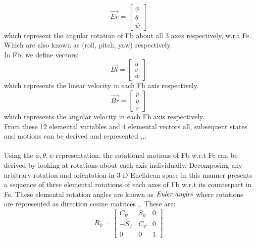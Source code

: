 \documentclass[12pt,a4paper,twoside]{report}
\begin{document}
			\\
			\begin{equation}
				\vec{Er} = 
				\begin{bmatrix}
					\phi \\
					\theta \\
					\psi
				\end{bmatrix}
			\end{equation}
			which represent the angular rotation of Fb about all 3 axes respectively, w.r.t Fe. Which are also known as (roll, pitch, yaw) respectively.
			\\
			In Fb, we define vectors:
			\\
			\begin{equation}
				\vec{Bl} = 
				\begin{bmatrix}
					u \\
					v \\
					w
				\end{bmatrix}
			\end{equation}
			which represents the linear velocity in each Fb axis respectively.
			\\
			\begin{equation}
				\vec{Br} = 
				\begin{bmatrix}
					p \\
					q \\
					r
				\end{bmatrix}
			\end{equation}
			which represents the angular velocity in each Fb axis respectively.
			\\
			From these 12 elemental variables and 4 elemental vectors all, subsequent states and motions can be derived and represented \cite{1},\cite{2},\cite{4}.
			\\ \\
			Using the \(\phi, \theta, \psi\) representation, the rotational motions of Fb w.r.t Fe can be derived by looking at rotations about each axis individually. Decomposing any arbitrary rotation and orientation in 3-D Euclidean space in this manner presents a sequence of three elemental rotations of each axes of Fb w.r.t its counterpart in Fe. These elemental rotation angles are known as $\emph{Euler angles}$  where rotations are represented as direction cosine matrices \cite{1},\cite{2}. These are:
			\\
			\begin{equation}
				R_\psi = 
				\begin{bmatrix}
					C_\psi & S_\psi & 0  \\
					-S_\psi & C_\psi & 0  \\
					0 & 0 & 1
				\end{bmatrix}
			\end{equation}
\end{document}
